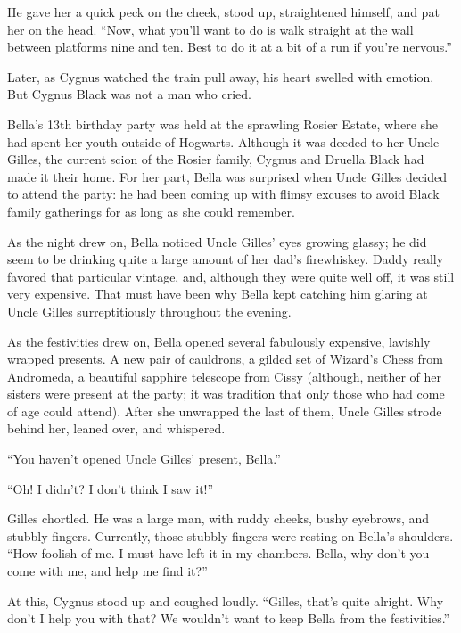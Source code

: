 He gave her a quick peck on the cheek, stood up, straightened himself, and pat her on the head. “Now, what you’ll want to do is walk straight at the wall between platforms nine and ten. Best to do it at a bit of a run if you’re nervous.”

Later, as Cygnus watched the train pull away, his heart swelled with emotion. But Cygnus Black was not a man who cried.
\simpleline


Bella’s 13th birthday party was held at the sprawling Rosier Estate, where she had spent her youth outside of Hogwarts. Although it was deeded to her Uncle Gilles, the current scion of the Rosier family, Cygnus and Druella Black had made it their home. For her part, Bella was surprised when Uncle Gilles decided to attend the party: he had been coming up with flimsy excuses to avoid Black family gatherings for as long as she could remember.

As the night drew on, Bella noticed Uncle Gilles’ eyes growing glassy; he did seem to be drinking quite a large amount of her dad’s firewhiskey. Daddy really favored that particular vintage, and, although they were quite well off, it was still very expensive. That must have been why Bella kept catching him glaring at Uncle Gilles surreptitiously throughout the evening.

As the festivities drew on, Bella opened several fabulously expensive, lavishly wrapped presents. A new pair of cauldrons, a gilded set of Wizard’s Chess from Andromeda, a beautiful sapphire telescope from Cissy (although, neither of her sisters were present at the party; it was tradition that only those who had come of age could attend). After she unwrapped the last of them, Uncle Gilles strode behind her, leaned over, and whispered.

“You haven’t opened Uncle Gilles’ present, Bella.”

“Oh! I didn’t? I don’t think I saw it!”

Gilles chortled. He was a large man, with ruddy cheeks, bushy eyebrows, and stubbly fingers. Currently, those stubbly fingers were resting on Bella’s shoulders. “How foolish of me. I must have left it in my chambers. Bella, why don’t you come with me, and help me find it?”

At this, Cygnus stood up and coughed loudly. “Gilles, that’s quite alright. Why don’t I help you with that? We wouldn’t want to keep Bella from the festivities.”

